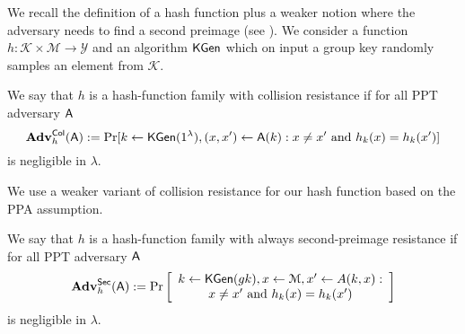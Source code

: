 
We recall the definition of a hash function plus a weaker notion where the adversary needs to find a second preimage (see \cite{FSE:RogShr04}). We consider a function $h:\mathcal{K}\times\mathcal{M}\to\mathcal{Y}$ and an algorithm $\mathsf{KGen}$ which on input a group key randomly samples an element from $\mathcal{K}$.

\begin{definition}\label{def:hash1}
 We say that $h$ is a hash-function family with collision resistance if for all PPT adversary $\mathsf{A}$
$$
\mathbf{Adv}_h^{\mathsf{Col}}(\mathsf{A}) := \Pr[k\gets\mathsf{KGen}(1^\lambda), (x,x')\gets \mathsf{A}(k):x\neq x'\text{ and }h_k(x)=h_k(x')]
$$ 
is negligible in $\lambda$.
\label{def:collision-resistance}
\end{definition}

We use a weaker variant of collision resistance for our hash function based on the PPA assumption.

\begin{definition}\label{def:hash2}
 We say that $h$ is a hash-function family with always second-preimage resistance if for all PPT adversary $\mathsf{A}$
$$
\mathbf{Adv}_h^{\mathsf{Sec}}(\mathsf{A}) := \Pr\left[\begin{array}{c}
k\gets\mathsf{KGen}(gk), x\gets\mathcal{M}, x'\gets A(k,x):\\
 x\neq x'\text{ and }h_k(x)=h_k(x')
 \end{array}\right]
$$ 
is negligible in $\lambda$.
\end{definition}
%
